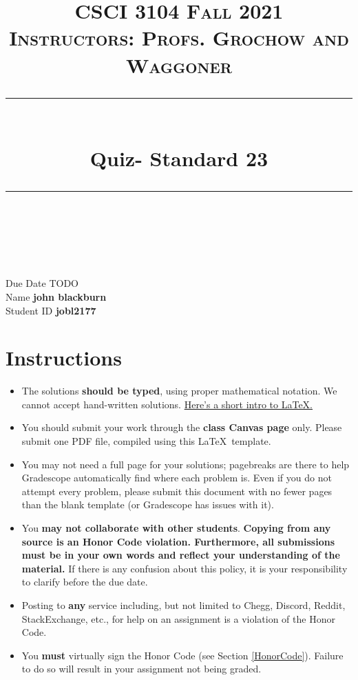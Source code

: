 \documentclass[11pt]{article}
\title{
\normalfont \normalsize 
\textsc{CSCI 3104 Fall 2021 \\ 
Instructors: Profs. Grochow and Waggoner} \\
[10pt] 
\rule{\linewidth}{0.5pt} \\[6pt] 
\huge Quiz- Standard 23 \\
\rule{\linewidth}{2pt}  \\[10pt]
}
\date{}
\theoremstyle{definition}
\theoremstyle{definition}
\theoremstyle{definition}
\begin{document}

\maketitle


\noindent
Due Date \dotfill TODO \\
Name \dotfill \textbf{john blackburn} \\
Student ID \dotfill \textbf{jobl2177} \\


\tableofcontents

\section{Instructions}
 \begin{itemize}
	\item The solutions \textbf{should be typed}, using proper mathematical notation. We cannot accept hand-written solutions. \href{http://ece.uprm.edu/~caceros/latex/introduction.pdf}{Here's a short intro to \LaTeX.}
	\item You should submit your work through the \textbf{class Canvas page} only. Please submit one PDF file, compiled using this \LaTeX \ template.
	\item You may not need a full page for your solutions; pagebreaks are there to help Gradescope automatically find where each problem is. Even if you do not attempt every problem, please submit this document with no fewer pages than the blank template (or Gradescope has issues with it).

	\item You \textbf{may not collaborate with other students}. \textbf{Copying from any source is an Honor Code violation. Furthermore, all submissions must be in your own words and reflect your understanding of the material.} If there is any confusion about this policy, it is your responsibility to clarify before the due date. 

	\item Posting to \textbf{any} service including, but not limited to Chegg, Discord, Reddit, StackExchange, etc., for help on an assignment is a violation of the Honor Code.

	\item You \textbf{must} virtually sign the Honor Code (see Section \ref{HonorCode}). Failure to do so will result in your assignment not being graded.
\end{itemize}
\end{document}
